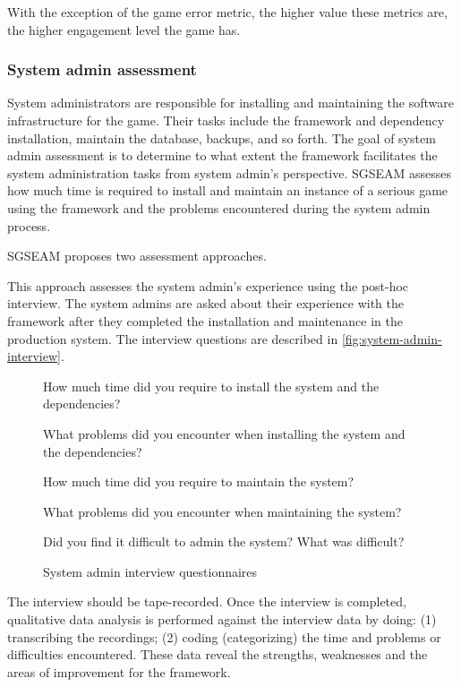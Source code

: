 With the exception of the game error metric, the higher value these metrics are, the higher engagement 
level the game has.

\subsubsection{System admin assessment}

System administrators are responsible for installing and maintaining the software infrastructure
for the game. Their tasks include the framework and dependency installation, maintain the database, 
backups, and so forth. The goal of system admin assessment is to determine to what extent the 
framework facilitates the system administration tasks from system admin's perspective. SGSEAM 
assesses how much time is required to install and maintain an instance of a serious game using the 
framework and the problems encountered  during the system admin process.
 
SGSEAM proposes two assessment approaches.

\label{Post-hoc system admin interview}

This approach assesses the system admin's experience using the post-hoc interview. The system admins 
are asked about their experience with the framework after they completed the installation and maintenance
 in the production system. The interview questions are described in \autoref{fig:system-admin-interview}.

\begin{figure}[ht!]
\begin{mybox}
\begin{compactenum}
\item How much time did you require to install the system and the dependencies?
\item What problems did you encounter when installing the system and the dependencies?
\item How much time did you require to maintain the system?
\item What problems did you encounter when maintaining the system?
\item Did you find it difficult to admin the system? What was difficult?
\end{compactenum}
\end{mybox}
\caption{System admin interview questionnaires}
\label{fig:system-admin-interview}  
\end{figure}

The interview should be tape-recorded. Once the interview is completed, qualitative data
analysis is performed against the interview data by doing: (1) transcribing the recordings; 
(2) coding (categorizing) the time and problems or difficulties encountered. These data reveal the 
strengths, weaknesses and the areas of improvement for the framework.

